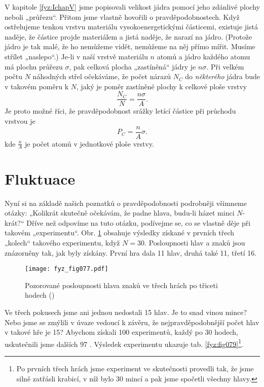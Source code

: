     V kapitole \ref{fyz:IchapV} jsme popisovali velikost jádra pomocí jeho zdánlivé plochy neboli 
    „průřezu“. Přitom jsme vlastně hovořili o pravděpodobnostech. Když ostřelujeme tenkou vrstvu 
    materiálu vysokoenergetickými částicemi, existuje jistá naděje, že částice projde materiálem a 
    jistá naděje, že narazí na jádro. (Protože jádro je tak malé, že ho nemůžeme vidět, nemůžeme na 
    něj přímo mířit. Musíme střílet „naslepo“.) Je-li v naší vrstvě materiálu \(n\) atomů a jádro 
    každého atomu má plochu průřezu \(\sigma\), pak celková plocha „zastíněná“ jádry je 
    \(n\sigma\). Při velkém počtu \(N\) náhodných střel očekáváme, že počet nárazů \(N_C\) do 
    \emph{některého} jádra bude v takovém poměru k \(N\), jaký je poměr zastíněné plochy k celkové 
    ploše vrstvy
    \begin{equation}\label{fyz:eq072}
      \frac{N_C}{N} = \frac{n\sigma}{A}.
    \end{equation}
    Je proto možné říci, že pravděpodobnost srážky letící částice při průchodu vrstvou je
    \begin{equation}\label{fyz:eq073}
      P_C = \frac{n}{A}\sigma.
    \end{equation}
    kde \(\frac{n}{A}\) je počet atomů v jednotkové ploše vrstvy.
    
  \section{Fluktuace}
    Nyní si na základě našich poznatků o pravděpodobnosti podrobněji všimneme otázky: „Kolikrát 
    skutečně očekávám, že padne hlava, budu-li házet minci \(N\)- krát?“ Dříve než odpovíme na tuto 
    otázku, podívejme se, co se vlastně děje při takovém „experimentu“. Obr. \ref{fyz:fig077} 
    obsahuje výsledky získané v prvních třech „kolech“ takového experimentu, když \(N= 30\). 
    Posloupnosti hlav a znaků jsou znázorněny tak, jak byly získány. První hra dala \num{11} hlav, 
    druhá také \num{11}, třetí \num{16}.
    
    \begin{figure}[ht!]  %
      \centering
      \texttt{[image: fyz\_fig077.pdf]}
      \caption{Pozorované posloupnosti hlava znaků ve třech hrách po třiceti hodech 
              (\cite[s.~79]{Feynman01})}
      \label{fyz:fig077}
    \end{figure}
    Ve třech pokusech jsme ani jednou nedostali \num{15} hlav. Je to snad vinou mince? Nebo jsme se 
    zmýlili v úvaze vedoucí k závěru, že nejpravděpodobnější počet hlav v takové hře je \num{15}? 
    Abychom získali \num{100} experimentů, každý po \num{30} hodech, uskutečnili jsme dalších 
    \num{97} . Výsledek experimentu ukazuje tab. \ref{fyz:fig079}\footnote{Po prvních třech 
    hrách jsme experiment ve skutečnosti provedli tak, že jsme silně zatřásli krabicí, v níž bylo 
    \num{30} mincí a pak jsme spočetli všechny hlavy.}.
    
